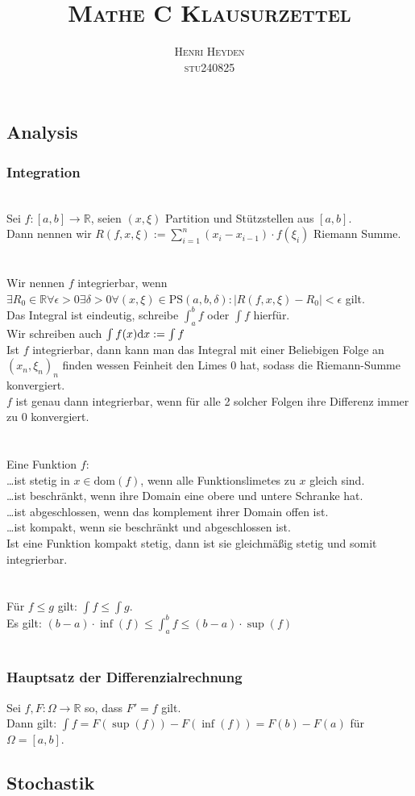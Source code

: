 \documentclass[a4paper, 12pt]{article}
\title{\scshape Mathe C Klausurzettel}
\author{\scshape Henri Heyden\\\small stu240825}
\date{}
\newcommand*{\R}{\mathbb R}
\begin{document}
\maketitle
\subsection*{Analysis}
\subsubsection*{Integration}
\\
Sei \(f : [a,b] \rightarrow \R\), seien \((x, \xi)\) Partition und Stützstellen aus \([a,b]\).\\
Dann nennen wir \(R(f,x,\xi) := \sum_{i=1}^n (x_i - x_{i-1}) \cdot f(\xi_i)\) Riemann Summe. \\ \\
\\
Wir nennen \(f\) integrierbar, wenn\\\(\exists R_0 \in \R \forall \epsilon > 0 \exists \delta > 0 \forall(x,\xi) \in \text{PS}(a,b,\delta): |R(f,x,\xi) - R_0| < \epsilon\) gilt. \\
Das Integral ist eindeutig, schreibe \(\int_{a}^{b} f\) oder \(\int f\) hierfür. \\
Wir schreiben auch \(\int f(x)\text dx := \int f\) \\
Ist \(f\) integrierbar, dann kann man das Integral mit einer Beliebigen Folge an \((x_n,\xi_n)_n\) finden wessen Feinheit den Limes 0 hat, sodass die Riemann-Summe konvergiert. \\
\(f\) ist genau dann integrierbar, wenn für alle 2 solcher Folgen ihre Differenz immer zu 0 konvergiert. \\ \\
 \\
Eine Funktion \(f\): \\
\dots ist stetig in \(x \in \text{dom}(f)\), wenn alle Funktionslimetes zu \(x\) gleich sind.\\
\dots ist beschränkt, wenn ihre Domain eine obere und untere Schranke hat. \\
\dots ist abgeschlossen, wenn das komplement ihrer Domain offen ist. \\
\dots ist kompakt, wenn sie beschränkt und abgeschlossen ist. \\
Ist eine Funktion kompakt stetig, dann ist sie gleichmäßig stetig und somit integrierbar. \\ \\
 \\
Für \(f \le g\) gilt: \(\int f \le \int g\). \\
Es gilt: \((b-a) \cdot \inf(f) \le \int_{a}^{b}f \le (b-a) \cdot \sup(f)\) \\ \\
\subsubsection*{Hauptsatz der Differenzialrechnung}
Sei \(f,F: \Omega \rightarrow \R\) so, dass \(F' = f\) gilt. \\
Dann gilt: \(\int f = F(\sup(f)) - F(\inf(f)) = F(b) - F(a)\) für \(\Omega = [a,b]\). \\

\subsection*{Stochastik}
\end{document}

